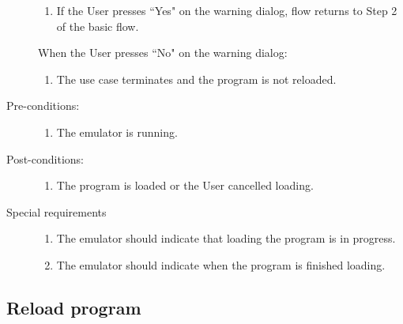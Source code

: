 \documentclass[12pt]{article}
\begin{document}
\begin{description}
\begin{enumerate}
			\item{If the User presses ``Yes" on the warning dialog, flow returns to Step 2 of the basic flow.}
		\end{enumerate}
	When the User presses ``No" on the warning dialog:
        \begin{enumerate}
          \item{The use case terminates and the program is not reloaded.}
        \end{enumerate}
      \item[Pre-conditions:] \hfill
        \begin{enumerate}
          \item{The emulator is running.}
        \end{enumerate}
      \item[Post-conditions:] \hfill
        \begin{enumerate}
	  \item{The program is loaded or the User cancelled loading.}
        \end{enumerate}
      \item[Special requirements] \hfill
        \begin{enumerate}
          \item{The emulator should indicate that loading the program is in progress.}
          \item{The emulator should indicate when the program is finished loading.}
        \end{enumerate}
    \end{description}
  \subsection{Reload program}
\end{document}
